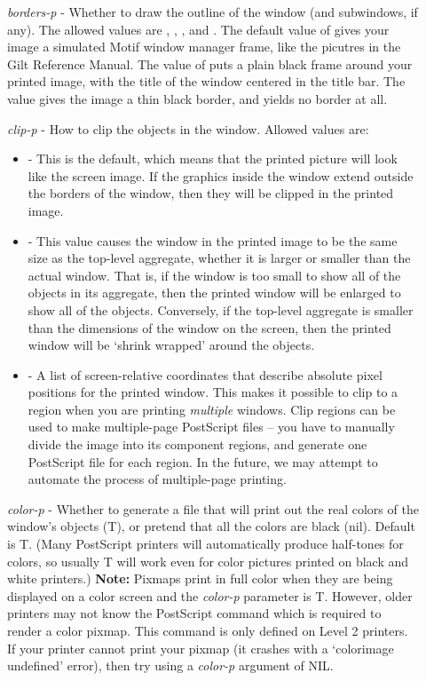 \begin{description}
\item[] {\it borders-p} - Whether to draw the outline of the window (and subwindows,
if any).  The allowed values are , ,
, and .  The default value of  gives your
image a simulated Motif window manager frame, like the picutres in the Gilt
Reference Manual.  The value of  puts a plain black frame around
your printed image, with the title of the window centered in the title bar.
The value  gives the image a thin black border, and  yields no
border at all.

\item[] {\it clip-p} - How to clip the objects in the window.  Allowed values are:

\begin{itemize}
\item {} - This is the default, which means that the printed picture will look
like the screen image.  If the graphics inside the window extend outside the
borders of the window, then they will be clipped in the printed image.

\item {} - This value causes the window in the printed image to be the same
size as the top-level aggregate, whether it is larger or smaller than the
actual window.  That is, if the window is too small to show all of the objects
in its aggregate, then the printed window will be enlarged to show all of the
objects.  Conversely, if the top-level aggregate is smaller than the dimensions
of the window on the screen, then the printed window will be `shrink wrapped'
around the objects.

\item {} - A list of screen-relative coordinates that
describe absolute pixel positions for the printed window.  This makes it
possible to clip to a region when you are printing {\it multiple} windows.
Clip regions can be used to make multiple-page PostScript
files -- you have to manually divide the image into its component regions,
and generate one PostScript file for each region.  In the future, we may
attempt to automate the process of multiple-page printing.
\end{itemize}

\item[] {\it color-p} - Whether to generate a file that will print out the real colors
of the window's objects (T), or pretend that all the colors are
black ({\sc nil}).  Default is T.  (Many PostScript printers will
automatically produce half-tones for colors, so usually T will work
even for color pictures printed on black and white printers.)  {\bf Note:}
 
Pixmaps print in full color when they are being displayed on a color
screen and the {\it color-p} parameter is T.  However, older
printers may not know the PostScript command  which is
required to render a color pixmap.  This command is only defined on Level 2
printers. If your printer cannot print your pixmap (it crashes with a
`colorimage undefined' error), then try using a {\it color-p} argument of
{\sc NIL}.


\end{description}
